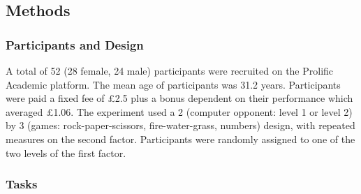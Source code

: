 \documentclass[man,floatsintext]{apa6}
\begin{document}
\hypertarget{methods}{%
\subsection{Methods}\label{methods}}

\hypertarget{participants-and-design}{%
\subsubsection{Participants and Design}\label{participants-and-design}}

A total of 52 (28 female, 24 male) participants were recruited on the Prolific Academic platform. The mean age of participants was 31.2 years. Participants were paid a fixed fee of £2.5 plus a bonus dependent on their performance which averaged £1.06. The experiment used a 2 (computer opponent: level 1 or level 2) by 3 (games: rock-paper-scissors, fire-water-grass, numbers) design, with repeated measures on the second factor. Participants were randomly assigned to one of the two levels of the first factor.

\hypertarget{tasks}{%
\subsubsection{Tasks}\label{tasks}}
\end{document}
